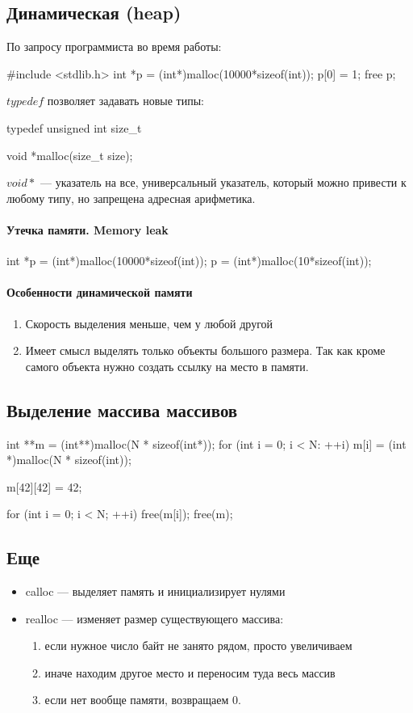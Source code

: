 \subsection{Динамическая (heap)}
По запросу программиста во время работы:
\begin{ccode}
#include <stdlib.h>
int *p = (int*)malloc(10000*sizeof(int));
p[0] = 1;
free p;
\end{ccode}
$ typedef$ позволяет задавать новые типы:
\begin{ccode}
typedef unsigned int size_t
\end{ccode}
\begin{ccode}
void *malloc(size_t size);
\end{ccode}
$ void *$ --- указатель на все, универсальный указатель, который можно привести к любому типу, но запрещена адресная арифметика.

\paragraph{Утечка памяти. Memory leak}
\begin{ccode}
int *p = (int*)malloc(10000*sizeof(int));
p = (int*)malloc(10*sizeof(int));
\end{ccode}
\paragraph{Особенности динамической памяти}
\begin{enumerate}[noitemsep]
    \item Скорость выделения меньше, чем у любой другой
    \item  Имеет смысл выделять только объекты большого размера. Так как кроме самого объекта нужно создать ссылку на место в памяти.
\end{enumerate}
\subsection{Выделение массива массивов}
\begin{ccode}
int **m = (int**)malloc(N * sizeof(int*));
for (int i = 0; i < N: ++i) {
    m[i] = (int *)malloc(N * sizeof(int));
}

m[42][42] = 42;

for (int i = 0; i < N; ++i) {
    free(m[i]);
}
free(m);
\end{ccode}
\subsection{Еще}
\begin{itemize}[noitemsep]
    \item calloc
	--- выделяет память и инициализирует нулями
    \item realloc
	--- изменяет размер существующего массива:
	\begin{enumerate}[noitemsep]
	    \item если нужное число байт не занято рядом, просто увеличиваем
	    \item иначе находим другое место и переносим туда весь массив
	    \item если нет вообще памяти, возвращаем 0.
	\end{enumerate}
\end{itemize}
% 

